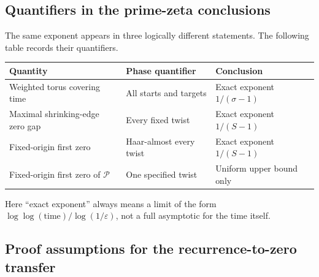 \documentclass[11pt,letterpaper]{article}
\theoremstyle{definition}
\theoremstyle{remark}
\newcommand{\eps}{\varepsilon}
\newcommand{\1}{\mathbf 1}
\begin{document}
\subsection{Quantifiers in the prime-zeta conclusions}

The same exponent appears in three logically different statements.
The following table records their quantifiers.
\begin{center}
\small
\begin{tabular}{@{}>{\raggedright\arraybackslash}p{.35\linewidth}
 >{\raggedright\arraybackslash}p{.32\linewidth}
 >{\raggedright\arraybackslash}p{.25\linewidth}@{}}
\toprule
Quantity & Phase quantifier & Conclusion\\
\midrule
Weighted torus covering time & All starts and targets & Exact exponent
$1/(\sigma-1)$\\[3pt]
Maximal shrinking-edge zero gap & Every fixed twist & Exact exponent
$1/(S-1)$\\[3pt]
Fixed-origin first zero & Haar-almost every twist & Exact exponent
$1/(S-1)$\\[3pt]
Fixed-origin first zero of $\mathcal P$ & One specified twist & Uniform
upper bound only\\
\bottomrule
\end{tabular}
\end{center}
Here ``exact exponent'' always means a limit of the form
$\log\log(\text{time})/\log(1/\eps)$, not a full asymptotic for the
time itself.

\subsection{Proof assumptions for the recurrence-to-zero transfer}
\end{document}
